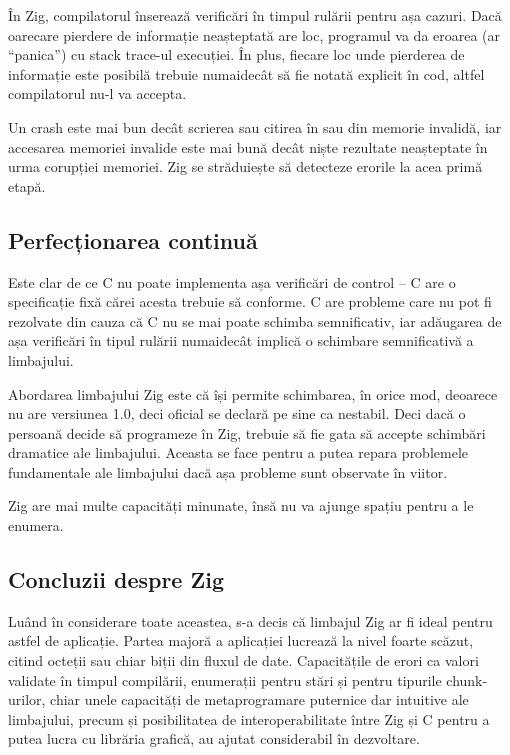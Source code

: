\documentclass[a4paper,12pt]{report}
\begin{document}
În Zig, compilatorul înserează verificări în timpul rulării pentru așa cazuri.
Dacă oarecare pierdere de informație neașteptată are loc,
programul va da eroarea (ar ``panica'') cu stack trace-ul execuției.
În plus, fiecare loc unde pierderea de informație este posibilă trebuie numaidecât
să fie notată explicit în cod, altfel compilatorul nu-l va accepta.

Un crash este mai bun decât scrierea sau citirea în sau din memorie invalidă,
iar accesarea memoriei invalide este mai bună decât niște rezultate neașteptate
în urma corupției memoriei.
Zig se străduiește să detecteze erorile la acea primă etapă.

\subsection{Perfecționarea continuă}

Este clar de ce C nu poate implementa așa verificări de control --
C are o specificație fixă cărei acesta trebuie să conforme.
C are probleme care nu pot fi rezolvate din cauza că C nu se mai poate schimba semnificativ,
iar adăugarea de așa verificări în tipul rulării numaidecât implică
o schimbare semnificativă a limbajului.

Abordarea limbajului Zig este că își permite schimbarea,
în orice mod, deoarece nu are versiunea 1.0, deci oficial se declară pe sine ca nestabil.
Deci dacă o persoană decide să programeze în Zig,
trebuie să fie gata să accepte schimbări dramatice ale limbajului.
Aceasta se face pentru a putea repara problemele fundamentale
ale limbajului dacă așa probleme sunt observate în viitor.

Zig are mai multe capacități minunate, însă nu va ajunge spațiu pentru a le enumera.

\subsection{Concluzii despre Zig}

Luând în considerare toate aceastea, s-a decis că limbajul Zig ar fi ideal pentru astfel de aplicație.
Partea majoră a aplicației lucrează la nivel foarte scăzut,
citind octeții sau chiar biții din fluxul de date.
Capacitățile de erori ca valori validate în timpul compilării,
enumerații pentru stări și pentru tipurile chunk-urilor,
chiar unele capacități de metaprogramare puternice dar intuitive ale limbajului,
precum și posibilitatea de interoperabilitate între Zig și C pentru a putea lucra cu librăria grafică,
au ajutat considerabil în dezvoltare.
\end{document}

